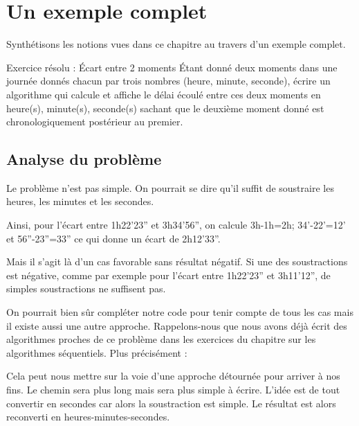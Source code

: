 
\section{Un exemple complet}

Synthétisons les notions vues dans ce chapitre au travers
d'un exemple complet.


\begin{Emphase}[exercice]{Exercice résolu : Écart entre 2 moments}
	Étant donné deux moments dans une journée donnés chacun par trois
	nombres (heure, minute, seconde), écrire un algorithme qui calcule et
	affiche le délai écoulé entre ces deux moments en heure(s), minute(s),
	seconde(s) sachant que le deuxième moment donné est chronologiquement
	postérieur au premier.
\end{Emphase}

\subsection*{Analyse du problème}

	Le problème n'est pas simple. 
	On pourrait se dire qu'il suffit de soustraire les heures, 
	les minutes et les secondes.

	Ainsi, pour l'écart entre
	1h22'23'' et
	3h34'56'', on
	calcule 3h-1h=2h;
	34'-22'=12' et
	56''-23''=33''
	ce qui donne un écart de
	2h12'33''.

	Mais il s'agit là d'un cas favorable
	sans résultat négatif. Si une des soustractions est négative, comme par
	exemple pour l'écart entre
	1h22'23'' et
	3h11'12'', de
	simples soustractions ne suffisent pas.

	On pourrait bien sûr compléter notre code pour tenir compte de tous les
	cas mais il existe aussi une autre approche. Rappelons-nous que nous
	avons déjà écrit des algorithmes proches de ce problème dans les
	exercices du chapitre sur les algorithmes séquentiels. Plus précisément
	:


	Cela peut nous mettre sur la voie d'une approche
	détournée pour arriver à nos fins. Le chemin sera plus long mais sera
	plus simple à écrire. L'idée est de tout convertir en
	secondes car alors la soustraction est simple. Le résultat est alors
	reconverti en heures-minutes-secondes.


